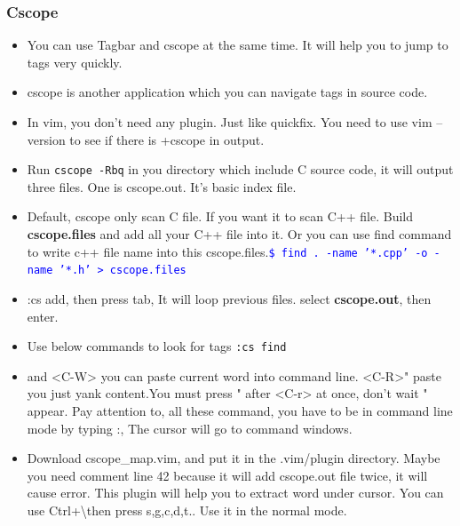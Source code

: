 \documentclass[paper=8.5in:11in, twoside, 12pt, pagesize=pdftex]{book}
\newcommand{\linuxcommand}[1]{\texttt{\textcolor{blue}{\$ #1 \Pisymbol{psy}{191}}}}
\begin{document}
									\subsubsection{Cscope}
									\begin{itemize}
										
										\item You can use Tagbar and cscope at the same time. It will help you to jump to tags very quickly.
										
										\item cscope is another application which you can navigate tags in source code. 
										
										\item In vim, you don't need any plugin. Just like quickfix. You need to use vim --version to see if there is +cscope in output. 
										
										\item Run \verb=cscope -Rbq= in you directory which include C source code, it will output three files. One is cscope.out. It's basic index file. 
										
										\item Default, cscope only scan C file. If you want it to scan C++ file. Build \textbf{cscope.files} and add all your C++ file into it. Or you can use find command to write c++ file name into this cscope.files.\linuxcommand{find . -name '*.cpp' -o -name '*.h' > cscope.files}
										
										\item :cs add, then press tab, It will loop previous files. select \textbf{cscope.out}, then enter.
										
										\item Use below commands to look for tags \verb=:cs find= 
										
										\item <C-R> and <C-W> you can paste current word into command line. <C-R>" paste you just yank content.You must press " after <C-r> at once, don't wait " appear. Pay attention to, all these command, you have to be in command line mode by typing :, The cursor will go to command windows. 
										
										\item Download cscope\_map.vim, and put it in the .vim/plugin directory. Maybe you need comment line 42 because it will add cscope.out file twice, it will cause error. This plugin will help you to extract word under cursor. You can use Ctrl+\textbackslash then press s,g,c,d,t.. Use it in the normal mode. 
										

\end{itemize}
\end{document}
